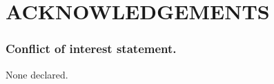 \documentclass[a4,center,fleqn]{NAR}
\begin{document}
\clearpage

\section{ACKNOWLEDGEMENTS}
\subsubsection{Conflict of interest statement.} None declared.


\end{document}
